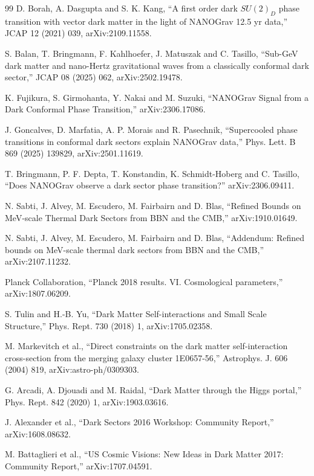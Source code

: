 \documentclass[11pt]{article}
\begin{document}
\begin{thebibliography}{99}
D. Borah, A. Dasgupta and S. K. Kang,
``A first order dark $SU(2)_D$ phase transition with vector dark matter in the light of NANOGrav 12.5 yr data,''
JCAP 12 (2021) 039,
arXiv:2109.11558.

S. Balan, T. Bringmann, F. Kahlhoefer, J. Matuszak and C. Tasillo,
``Sub-GeV dark matter and nano-Hertz gravitational waves from a classically conformal dark sector,''
JCAP 08 (2025) 062,
arXiv:2502.19478.

K. Fujikura, S. Girmohanta, Y. Nakai and M. Suzuki,
``NANOGrav Signal from a Dark Conformal Phase Transition,''
arXiv:2306.17086.

J. Goncalves, D. Marfatia, A. P. Morais and R. Pasechnik,
``Supercooled phase transitions in conformal dark sectors explain NANOGrav data,''
Phys. Lett. B 869 (2025) 139829,
arXiv:2501.11619.

T. Bringmann, P. F. Depta, T. Konstandin, K. Schmidt-Hoberg and C. Tasillo,
``Does NANOGrav observe a dark sector phase transition?''
arXiv:2306.09411.

N. Sabti, J. Alvey, M. Escudero, M. Fairbairn and D. Blas,
``Refined Bounds on MeV-scale Thermal Dark Sectors from BBN and the CMB,''
arXiv:1910.01649.

N. Sabti, J. Alvey, M. Escudero, M. Fairbairn and D. Blas,
``Addendum: Refined bounds on MeV-scale thermal dark sectors from BBN and the CMB,''
arXiv:2107.11232.

Planck Collaboration,
``Planck 2018 results. VI. Cosmological parameters,''
arXiv:1807.06209.

S. Tulin and H.-B. Yu,
``Dark Matter Self-interactions and Small Scale Structure,''
Phys. Rept. 730 (2018) 1,
arXiv:1705.02358.

M. Markevitch et al.,
``Direct constraints on the dark matter self-interaction cross-section from the merging galaxy cluster 1E0657-56,''
Astrophys. J. 606 (2004) 819,
arXiv:astro-ph/0309303.

G. Arcadi, A. Djouadi and M. Raidal,
``Dark Matter through the Higgs portal,''
Phys. Rept. 842 (2020) 1,
arXiv:1903.03616.

J. Alexander et al.,
``Dark Sectors 2016 Workshop: Community Report,''
arXiv:1608.08632.

M. Battaglieri et al.,
``US Cosmic Visions: New Ideas in Dark Matter 2017: Community Report,''
arXiv:1707.04591.
\end{thebibliography}
\end{document}
